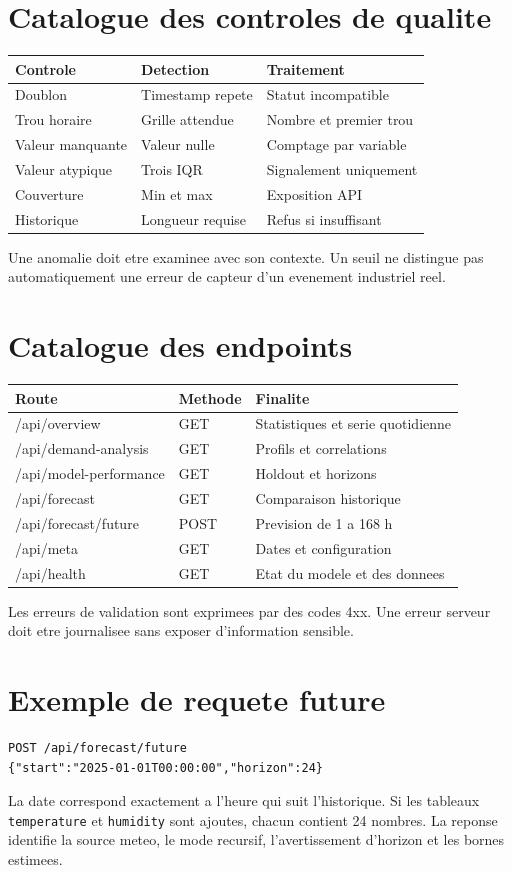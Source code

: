 \clearpage
\section{Catalogue des controles de qualite}
\begin{tabular}{p{4cm}p{5cm}p{5cm}}
\toprule Controle & Detection & Traitement\\\midrule
Doublon & Timestamp repete & Statut incompatible\\
Trou horaire & Grille attendue & Nombre et premier trou\\
Valeur manquante & Valeur nulle & Comptage par variable\\
Valeur atypique & Trois IQR & Signalement uniquement\\
Couverture & Min et max & Exposition API\\
Historique & Longueur requise & Refus si insuffisant\\
\bottomrule
\end{tabular}
Une anomalie doit etre examinee avec son contexte. Un seuil ne distingue pas automatiquement une erreur de capteur d'un evenement industriel reel.

\clearpage
\section{Catalogue des endpoints}
\begin{longtable}{p{4cm}p{2cm}p{7cm}}
\toprule Route & Methode & Finalite\\\midrule
/api/overview & GET & Statistiques et serie quotidienne\\
/api/demand-analysis & GET & Profils et correlations\\
/api/model-performance & GET & Holdout et horizons\\
/api/forecast & GET & Comparaison historique\\
/api/forecast/future & POST & Prevision de 1 a 168 h\\
/api/meta & GET & Dates et configuration\\
/api/health & GET & Etat du modele et des donnees\\
\bottomrule
\end{longtable}
Les erreurs de validation sont exprimees par des codes 4xx. Une erreur serveur doit etre journalisee sans exposer d'information sensible.

\clearpage
\section{Exemple de requete future}
\begin{verbatim}
POST /api/forecast/future
{"start":"2025-01-01T00:00:00","horizon":24}
\end{verbatim}
La date correspond exactement a l'heure qui suit l'historique. Si les tableaux \texttt{temperature} et \texttt{humidity} sont ajoutes, chacun contient 24 nombres. La reponse identifie la source meteo, le mode recursif, l'avertissement d'horizon et les bornes estimees.


